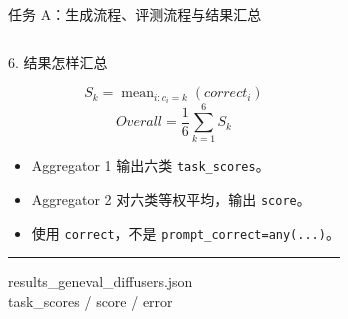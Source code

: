 \documentclass[aspectratio=169,10pt]{beamer}
\begin{document}
\begin{frame}{任务 A：生成流程、评测流程与结果汇总}
\begin{columns}[T,onlytextwidth]
      \begin{block}{6. 结果怎样汇总}
        \begin{minipage}[c][5.05cm][c]{\linewidth}
          \scriptsize
          \[
            S_k=\operatorname{mean}_{i:c_i=k}(correct_i)
          \]
          \[
            Overall=\frac{1}{6}\sum_{k=1}^{6}S_k
          \]
          \begin{itemize}\scriptsize
            \item Aggregator 1 输出六类 \texttt{task\_scores}。
            \item Aggregator 2 对六类等权平均，输出 \texttt{score}。
            \item 使用 \texttt{correct}，不是 \texttt{prompt\_correct=any(...)}。
          \end{itemize}
          \vspace{0.45em}
          \color{T2IGray}\rule{\linewidth}{0.35pt}\par\vspace{0.3em}
          \scriptsize\ttfamily
          results\_geneval\_diffusers.json\\
          task\_scores / score / error
        \end{minipage}
      \end{block}
  \end{columns}
\end{frame}
\end{document}
